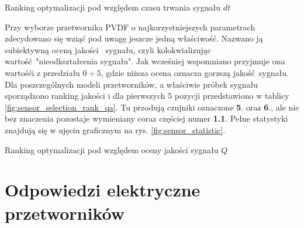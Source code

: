 \begin{table}[h]
  \caption{Ranking optymalizacji pod względem czasu trwania sygnału $dt$}
  \label{fig:sensor_selection_rank_dt}

  \centering
\end{table}

\indent Przy wyborze przetwornika PVDF o najkorzystniejszych parametrach zdecydowano
się wziąć pod uwagę jeszcze jedną właściwość. Nazwano ją subiektywną oceną jakości 
sygnału, czyli kolokwializując wartość "nieodkształcenia sygnału". Jak wcześniej wspomniano
przyjmuje ona wartośći z przedziału \textbf{$0 \div 5$}, gdzie niższa ocena oznacza
gorzszą jakość sygnału. Dla poszczególnych modeli przetworników, a właściwie próbek sygnału 
sporządzono ranking jakości i dla pierwszych 5 pozycji przedstawiono w tablicy 
\ref{fig:sensor_selection_rank_qa}. Tu przodują czujniki oznaczone \textbf{5}. oraz \textbf{6}., 
ale nie bez znaczenia pozostaje wymieniany coraz częściej numer \textbf{1.1}.
 Pełne statystyki znajdują się w ujęciu graficznym na rys. \ref{fig:sensor_statistic}. 


\begin{table}[h]
  \caption{Ranking optymalizacji pod względem oceny jakości sygnału $Q$}
  \label{fig:sensor_selection_rank_qa}

  \centering
\end{table}

\section{Odpowiedzi elektryczne przetworników}
\label{sec:signal_description}

